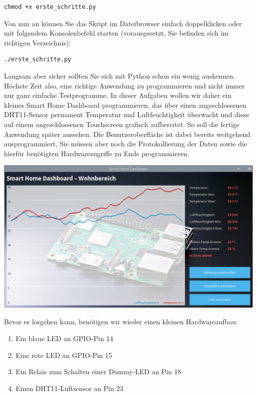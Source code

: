 \begin{Verbatim}[gobble=4]
    chmod +x erste_schritte.py
\end{Verbatim}

Von nun an können Sie das Skript im Dateibrowser einfach doppelklicken oder
mit folgendem Konsolenbefehl starten (vorausgesetzt, Sie befinden sich im
richtigen Verzeichnis):

\begin{Verbatim}[gobble=4]
    ./erste_schritte.py
\end{Verbatim}

\clearpage

\teilaufgabe
Langsam aber sicher sollten Sie sich mit Python schon ein wenig auskennen.
Höchste Zeit also, eine richtige Anwendung zu programmieren und nicht immer nur
ganz einfache Testprogramme. In dieser Aufgaben wollen wir daher ein kleines
Smart Home Dashboard programmieren, das über einen angeschlossenen DHT11-Sensor
permanent Temperatur und Luftfeuchtigkeit überwacht und diese auf einem
angeschlossenen Touchscreen grafisch aufbereitet. So soll die fertige Anwendung
später aussehen. Die Benutzeroberfläche ist dabei bereits weitgehend
ausprogrammiert, Sie müssen aber noch die Protokollierung der Daten sowie die
hierfür benötigten Hardwarezugriffe zu Ende programmieren.

\includegraphics[width=\textwidth]{3-python1/img/aufgabe-dashboard}

Bevor es losgehen kann, benötigen wir wieder einen kleinen Hardwareaufbau:

\begin{enumerate}
    \item Ein blaue LED an GPIO-Pin 14
    \item Eine rote LED an GPIO-Pin 15
    \item Ein Relais zum Schalten einer Dummy-LED an Pin 18
    \item Einen DHT11-Luftsensor an Pin 23
\end{enumerate}

